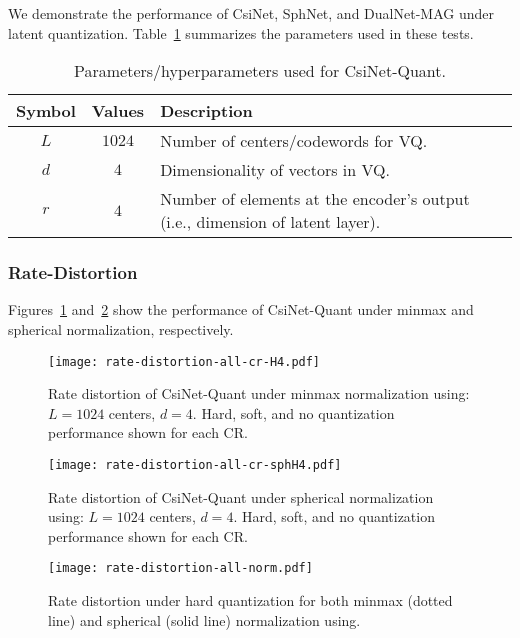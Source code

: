 We demonstrate the performance of CsiNet, SphNet, and DualNet-MAG under latent quantization. Table~\ref{tab:quant-params} summarizes the parameters used in these tests.

\begin{table}[]
\centering
\caption{Parameters/hyperparameters used for CsiNet-Quant.}
\label{tab:quant-params}
\begin{tabular}{c|c|l}
\toprule
\textbf{Symbol}   & \textbf{Values}  & \textbf{Description} \\ \midrule
$L$ 		  	  & $1024$	 		 & Number of centers/codewords for VQ.  \\ \hline
$d$               & $4$				 & Dimensionality of vectors in VQ.  \\ \hline
$r$               & $4$				 & Number of elements at the encoder's output (i.e., dimension of latent layer).  \\ \hline
\end{tabular}
\end{table}

\subsubsection{Rate-Distortion}

Figures~\ref{fig:rate-distortion-minmax} and~\ref{fig:rate-distortion-sph} show the performance of CsiNet-Quant under minmax and spherical normalization, respectively. 

\begin{figure}[htb] \centering 
  \texttt{[image: rate-distortion-all-cr-H4.pdf]}
  \caption{Rate distortion of CsiNet-Quant under minmax normalization using: $L=1024$ centers, $d=4$. Hard, soft, and no quantization performance shown for each CR.} 
  \label{fig:rate-distortion-minmax} 
\end{figure}

\begin{figure}[htb] \centering 
  \texttt{[image: rate-distortion-all-cr-sphH4.pdf]}
  \caption{Rate distortion of CsiNet-Quant under spherical normalization using: $L=1024$ centers, $d=4$. Hard, soft, and no quantization performance shown for each CR.} 
  \label{fig:rate-distortion-sph} 
\end{figure}

\begin{figure}[htb] \centering 
  \texttt{[image: rate-distortion-all-norm.pdf]}
  \caption{Rate distortion under hard quantization for both minmax (dotted line) and spherical (solid line) normalization using.} 
  \label{fig:rate-distortion-norms} 
\end{figure}

